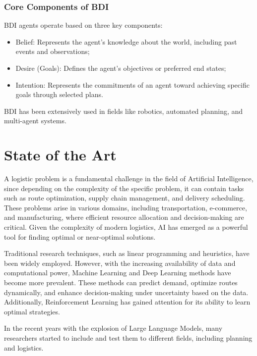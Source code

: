 \subsubsection{Core Components of BDI}
BDI agents operate based on three key components:
\begin{itemize}
  \item Belief: Represents the agent's knowledge about the world, including past
    events and observations;

  \item Desire (Goals): Defines the agent's objectives or preferred end states;

  \item Intention: Represents the commitments of an agent toward achieving
    specific goals through selected plans.
\end{itemize}
BDI has been extensively used in fields like robotics, automated planning, and
multi-agent systems.

\section{State of the Art}
\label{sec:state_of_the_art}

A logistic problem is a fundamental challenge in the field of Artificial Intelligence,
since depending on the complexity of the specific problem, it can contain tasks such
as route optimization, supply chain management, and delivery scheduling. These
problems arise in various domains, including transportation, e-commerce, and manufacturing,
where efficient resource allocation and decision-making are critical. Given the complexity
of modern logistics, AI has emerged as a powerful tool for finding optimal or
near-optimal solutions.

Traditional research techniques, such as linear programming and heuristics, have
been widely employed. However, with the increasing availability of data and
computational power, Machine Learning and Deep Learning methods have become more
prevalent. These methods can predict demand, optimize routes dynamically, and
enhance decision-making under uncertainty based on the data. Additionally,
Reinforcement Learning has gained attention for its ability to learn optimal
strategies.

In the recent years with the explosion of Large Language Models, many researchers
started to include and test them to different fields, including planning and
logistics.


